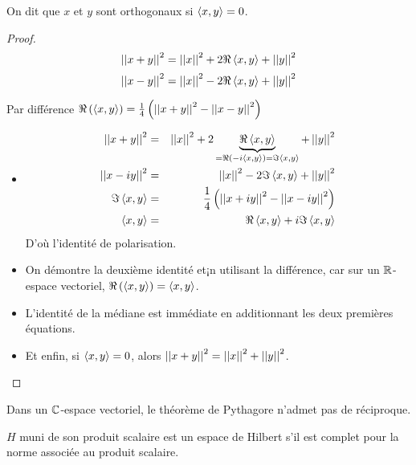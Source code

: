 \begin{definition}
	On dit que $x$ et $y$ sont orthogonaux si $\left\langle x, y \right\rangle = 0$.
\end{definition}

\begin{proof}
	$$\left|\left|x+y\right|\right|^2  = \left|\left|x\right|\right|^2 + 2\Re \left\langle x, y \right\rangle + \left|\left|y\right|\right|^2 $$
	$$\left|\left|x-y\right|\right|^2  = \left|\left|x\right|\right|^2 - 2\Re \left\langle x, y \right\rangle + \left|\left|y\right|\right|^2 $$

	Par différence $\Re \left(\left\langle x, y \right\rangle\right) = \frac{1}{4} \left( \left|\left|x+y\right|\right|^2 - \left|\left|x-y\right|\right|^2 \right)$
	\begin{itemize}
		\item
		      \begin{eqnarray*}
			      \left|\left|x+y\right|\right|^2  &=& \left|\left|x\right|\right|^2 + 2\underbrace{\Re \left\langle x, y \right\rangle }_{= \Re (-i\left\langle x, y \right\rangle) = \Im \left\langle x, y \right\rangle} + \left|\left|y\right|\right|^2 \\
			      \left|\left|x-iy\right|\right|^2 &=& \left|\left|x\right|\right|^2 - 2\Im \left\langle x, y \right\rangle + \left|\left|y\right|\right|^2 \\
			      \Im \left\langle x, y \right\rangle &=& \frac{1}{4} \left( \left|\left|x+iy\right|\right|^2 - \left|\left|x-iy\right|\right|^2 \right)\\
			      \left\langle x, y \right\rangle &=& \Re \left\langle x, y \right\rangle + i \Im \left\langle x, y \right\rangle
		      \end{eqnarray*}
		      D'où l'identité de polarisation.
		\item On démontre la deuxième identité et¡n utilisant la différence, car sur un $\mathbb{R}$-espace vectoriel, $\Re \left(\left\langle x, y \right\rangle\right) = \left\langle x, y \right\rangle$.
		\item L'identité de la médiane est immédiate en additionnant les deux premières équations.
		\item Et enfin, si $\left\langle x, y \right\rangle = 0$, alors $\left|\left|x+y\right|\right|^2 = \left|\left|x\right|\right|^2 + \left|\left|y\right|\right|^2$.
	\end{itemize} %
\end{proof}


\begin{remarque}
	Dans un $\mathbb{C}$-espace vectoriel, le théorème de Pythagore n'admet pas de réciproque.
\end{remarque}

\begin{definition}
	$H$ muni de son produit scalaire est un espace de Hilbert s'il est complet pour la norme associée au produit scalaire.
\end{definition}

